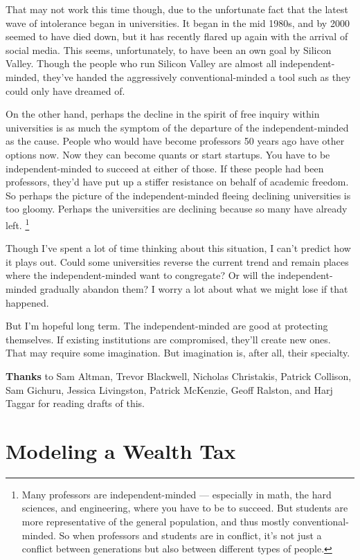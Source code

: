 \documentclass[12pt]{book}
\begin{document}
That may not work this time though, due to the unfortunate fact that the
latest wave of intolerance began in universities. It began in the mid
1980s, and by 2000 seemed to have died down, but it has recently flared
up again with the arrival of social media. This seems, unfortunately, to
have been an own goal by Silicon Valley. Though the people who run
Silicon Valley are almost all independent-minded, they've handed the
aggressively conventional-minded a tool such as they could only have
dreamed of.

On the other hand, perhaps the decline in the spirit of free inquiry
within universities is as much the symptom of the departure of the
independent-minded as the cause. People who would have become professors
50 years ago have other options now. Now they can become quants or start
startups. You have to be independent-minded to succeed at either of
those. If these people had been professors, they'd have put up a stiffer
resistance on behalf of academic freedom. So perhaps the picture of the
independent-minded fleeing declining universities is too gloomy. Perhaps
the universities are declining because so many have already left.
\footnote{Many professors are independent-minded --- especially in math,
the hard sciences, and engineering, where you have to be to succeed. But
students are more representative of the general population, and thus
mostly conventional-minded. So when professors and students are in
conflict, it's not just a conflict between generations but also between
different types of people.}

Though I've spent a lot of time thinking about this situation, I can't
predict how it plays out. Could some universities reverse the current
trend and remain places where the independent-minded want to congregate?
Or will the independent-minded gradually abandon them? I worry a lot
about what we might lose if that happened.

But I'm hopeful long term. The independent-minded are good at protecting
themselves. If existing institutions are compromised, they'll create new
ones. That may require some imagination. But imagination is, after all,
their specialty.


\textbf{Thanks} to Sam Altman, Trevor Blackwell, Nicholas Christakis,
Patrick Collison, Sam Gichuru, Jessica Livingston, Patrick McKenzie,
Geoff Ralston, and Harj Taggar for reading drafts of this.
\chapter{Modeling a Wealth Tax}
\end{document}
